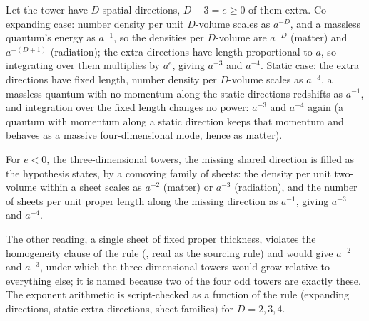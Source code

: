 Let the tower have $D$ spatial directions, $D - 3 = e \geq 0$ of them extra. Co-expanding case: number density per unit $D$-volume scales as $a^{-D}$, and a massless quantum's energy as $a^{-1}$, so the densities per $D$-volume are $a^{-D}$ (matter) and $a^{-(D+1)}$ (radiation); the extra directions have length proportional to $a$, so integrating over them multiplies by $a^{e}$, giving $a^{-3}$ and $a^{-4}$. Static case: the extra directions have fixed length, number density per $D$-volume scales as $a^{-3}$, a massless quantum with no momentum along the static directions redshifts as $a^{-1}$, and integration over the fixed length changes no power: $a^{-3}$ and $a^{-4}$ again (a quantum with momentum along a static direction keeps that momentum and behaves as a massive four-dimensional mode, hence as matter).

For $e < 0$, the three-dimensional towers, the missing shared direction is filled as the hypothesis states, by a comoving family of sheets: the density per unit two-volume within a sheet scales as $a^{-2}$ (matter) or $a^{-3}$ (radiation), and the number of sheets per unit proper length along the missing direction as $a^{-1}$, giving $a^{-3}$ and $a^{-4}$.

The other reading, a single sheet of fixed proper thickness, violates the homogeneity clause of the rule (, read as the sourcing rule) and would give $a^{-2}$ and $a^{-3}$, under which the three-dimensional towers would grow relative to everything else; it is named because two of the four odd towers are exactly these. The exponent arithmetic is script-checked as a function of the rule (expanding directions, static extra directions, sheet families) for $D = 2, 3, 4$.
